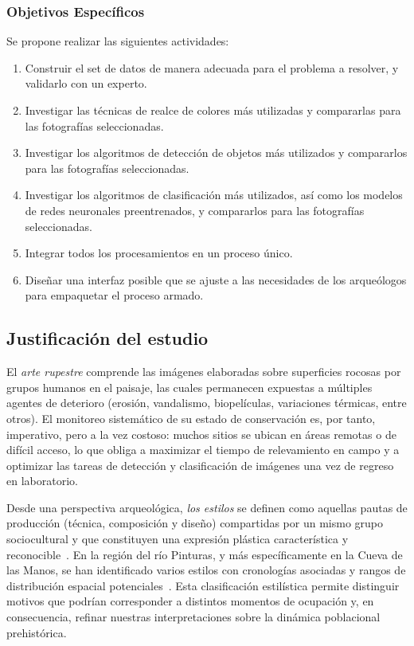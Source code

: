 \subsubsection{Objetivos Específicos}

Se propone realizar las siguientes actividades:
\begin{enumerate}
    \item Construir el set de datos de manera adecuada para el problema a resolver, y validarlo con un experto.
    \item Investigar las técnicas de realce de colores más utilizadas y compararlas para las fotografías seleccionadas.
    \item Investigar los algoritmos de detección de objetos más utilizados y compararlos para las fotografías seleccionadas.
    \item Investigar los algoritmos de clasificación más utilizados, así como los modelos de redes neuronales preentrenados, y compararlos para las fotografías seleccionadas.
    \item Integrar todos los procesamientos en un proceso único.
    \item Diseñar una interfaz posible que se ajuste a las necesidades de los arqueólogos para empaquetar el proceso armado.
\end{enumerate}

\subsection{Justificación del estudio}

El \emph{arte rupestre} comprende las imágenes elaboradas sobre superficies rocosas por grupos humanos en el paisaje, las cuales permanecen expuestas a múltiples agentes de deterioro (erosión, vandalismo, biopelículas, variaciones térmicas, entre otros).
El monitoreo sistemático de su estado de conservación es, por tanto, imperativo, pero a la vez costoso: muchos sitios se ubican en áreas remotas o de difícil acceso, lo que obliga a maximizar el tiempo de relevamiento en campo y a optimizar las tareas de detección y clasificación de imágenes una vez de regreso en laboratorio.

Desde una perspectiva arqueológica, \emph{los estilos} se definen como aquellas pautas de producción (técnica, composición y diseño) compartidas por un mismo grupo sociocultural y que constituyen una expresión plástica característica y reconocible~\cite{wiessner1983,aschero2012}.
En la región del río Pinturas, y más específicamente en la Cueva de las Manos, se han identificado varios estilos con cronologías asociadas y rangos de distribución espacial potenciales~\cite{gradin1978,gradin1979,aschero2018b}.
Esta clasificación estilística permite distinguir motivos que podrían corresponder a distintos momentos de ocupación y, en consecuencia, refinar nuestras interpretaciones sobre la dinámica poblacional prehistórica.

